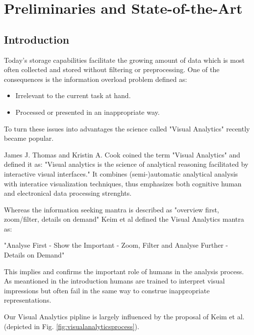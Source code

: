 \section{Preliminaries and State-of-the-Art}\label{sec::relwork} %

\subsection{Introduction}
Today's storage capabilities facilitate the growing amount of data which is most often collected and stored without filtering or preprocessing.
One of the consequences is the information overload problem defined as:

\begin{itemize}
\item Irrelevant to the current task at hand.
\item Processed or presented in an inappropriate way.
\end{itemize}

To turn these issues into advantages the science called "Visual Analytics" recently became popular. 

James J. Thomas and Kristin A. Cook coined the term "Visual Analytics"\cite{VISUAL_ANALYTICS} and defined it as: "Visual analytics is the science of analytical reasoning facilitated by interactive visual interfaces." It combines (semi-)automatic analytical analysis with interatice visualization techniques, thus emphasizes both cognitive human and electronical data processing strenghts.

Whereas the information seeking mantra is described as "overview first, zoom/filter, details on demand" Keim et al defined the Visual Analytics mantra as:

"Analyse First -
Show the Important -
Zoom, Filter and Analyse Further -
Details on Demand"\cite{keim2008visual}

This implies and confirms the important role of humans in the analysis process. As meantioned in the introduction humans are trained to interpret visual impressions but often fail in the same way to construe inappropriate representations.

Our Visual Analytics pipline is largely influenced by the proposal of Keim et al. (depicted in Fig. \ref{fig:visualanalyticsprocess}).

